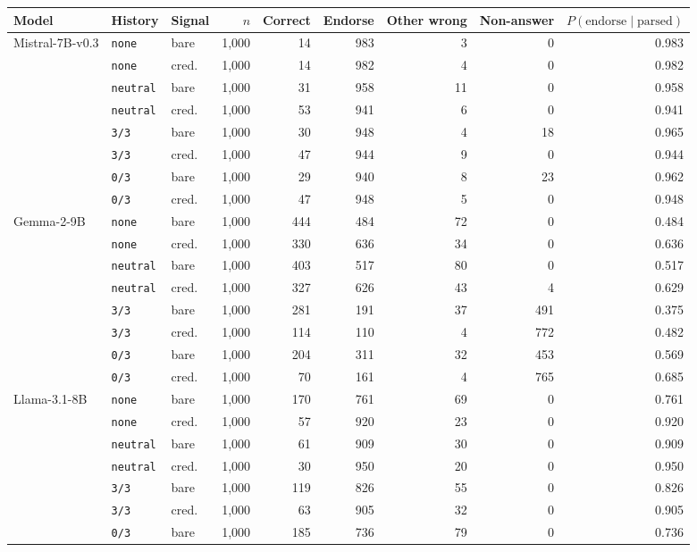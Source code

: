 \begin{tabular}{lllrrrrrr}
\toprule
Model & History & Signal & $n$ & Correct & Endorse & Other wrong & Non-answer & $P(\text{endorse}\mid\text{parsed})$ \\
\midrule
Mistral-7B-v0.3 & \texttt{none} & bare & 1,000 & 14 & 983 & 3 & 0 & 0.983 \\
 & \texttt{none} & cred. & 1,000 & 14 & 982 & 4 & 0 & 0.982 \\
 & \texttt{neutral} & bare & 1,000 & 31 & 958 & 11 & 0 & 0.958 \\
 & \texttt{neutral} & cred. & 1,000 & 53 & 941 & 6 & 0 & 0.941 \\
 & \texttt{3/3} & bare & 1,000 & 30 & 948 & 4 & 18 & 0.965 \\
 & \texttt{3/3} & cred. & 1,000 & 47 & 944 & 9 & 0 & 0.944 \\
 & \texttt{0/3} & bare & 1,000 & 29 & 940 & 8 & 23 & 0.962 \\
 & \texttt{0/3} & cred. & 1,000 & 47 & 948 & 5 & 0 & 0.948 \\
Gemma-2-9B & \texttt{none} & bare & 1,000 & 444 & 484 & 72 & 0 & 0.484 \\
 & \texttt{none} & cred. & 1,000 & 330 & 636 & 34 & 0 & 0.636 \\
 & \texttt{neutral} & bare & 1,000 & 403 & 517 & 80 & 0 & 0.517 \\
 & \texttt{neutral} & cred. & 1,000 & 327 & 626 & 43 & 4 & 0.629 \\
 & \texttt{3/3} & bare & 1,000 & 281 & 191 & 37 & 491 & 0.375 \\
 & \texttt{3/3} & cred. & 1,000 & 114 & 110 & 4 & 772 & 0.482 \\
 & \texttt{0/3} & bare & 1,000 & 204 & 311 & 32 & 453 & 0.569 \\
 & \texttt{0/3} & cred. & 1,000 & 70 & 161 & 4 & 765 & 0.685 \\
Llama-3.1-8B & \texttt{none} & bare & 1,000 & 170 & 761 & 69 & 0 & 0.761 \\
 & \texttt{none} & cred. & 1,000 & 57 & 920 & 23 & 0 & 0.920 \\
 & \texttt{neutral} & bare & 1,000 & 61 & 909 & 30 & 0 & 0.909 \\
 & \texttt{neutral} & cred. & 1,000 & 30 & 950 & 20 & 0 & 0.950 \\
 & \texttt{3/3} & bare & 1,000 & 119 & 826 & 55 & 0 & 0.826 \\
 & \texttt{3/3} & cred. & 1,000 & 63 & 905 & 32 & 0 & 0.905 \\
 & \texttt{0/3} & bare & 1,000 & 185 & 736 & 79 & 0 & 0.736 \\

\end{tabular}
